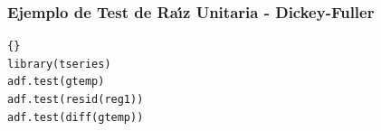 \subsubsection{Ejemplo de Test de Ra\'{\i}z Unitaria - Dickey-Fuller}
\begin{lstlisting}[title={‘Código R: Ejemplo Test de Raíz Unitaria - Dickey-Fuller ’},basicstyle=\ttfamily]{}
library(tseries)
adf.test(gtemp)
adf.test(resid(reg1))
adf.test(diff(gtemp))
\end{lstlisting}

